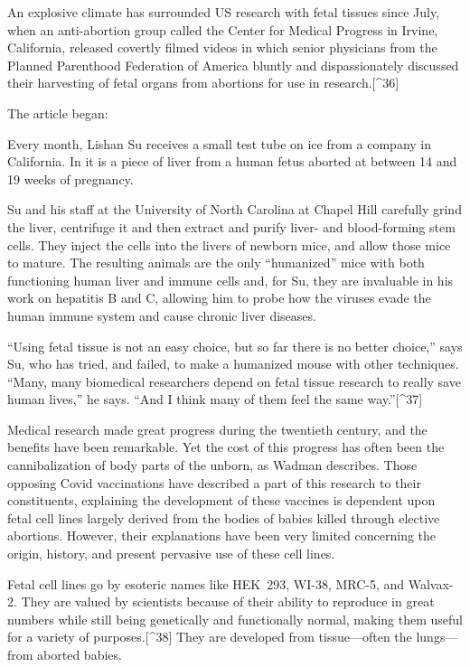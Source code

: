 \documentclass[
]{book}
\begin{document}
An explosive climate has surrounded US research with fetal tissues since July, when an anti-abortion group called the Center for Medical Progress in Irvine, California, released covertly filmed videos in which senior physicians from the Planned Parenthood Federation of America bluntly and dispassionately discussed their harvesting of fetal organs from abortions for use in research.{[}\^{}36{]}

The article began:

Every month, Lishan Su receives a small test tube on ice from a company in California. In it is a piece of liver from a human fetus aborted at between 14 and 19 weeks of pregnancy.

Su and his staff at the University of North Carolina at Chapel Hill carefully grind the liver, centrifuge it and then extract and purify liver- and blood-forming stem cells. They inject the cells into the livers of newborn mice, and allow those mice to mature. The resulting animals are the only ``humanized'' mice with both functioning human liver and immune cells and, for Su, they are invaluable in his work on hepatitis B and C, allowing him to probe how the viruses evade the human immune system and cause chronic liver diseases.

``Using fetal tissue is not an easy choice, but so far there is no better choice,'' says Su, who has tried, and failed, to make a humanized mouse with other techniques. ``Many, many biomedical researchers depend on fetal tissue research to really save human lives,'' he says. ``And I think many of them feel the same way.''{[}\^{}37{]}

Medical research made great progress during the twentieth century, and the benefits have been remarkable. Yet the cost of this progress has often been the cannibalization of body parts of the unborn, as Wadman describes. Those opposing Covid vaccinations have described a part of this research to their constituents, explaining the development of these vaccines is dependent upon fetal cell lines largely derived from the bodies of babies killed through elective abortions. However, their explanations have been very limited concerning the origin, history, and present pervasive use of these cell lines.

Fetal cell lines go by esoteric names like HEK~293, WI-38, MRC-5, and Walvax-2. They are valued by scientists because of their ability to reproduce in great numbers while still being genetically and functionally normal, making them useful for a variety of purposes.{[}\^{}38{]} They are developed from tissue---often the lungs---from aborted babies.
\end{document}
